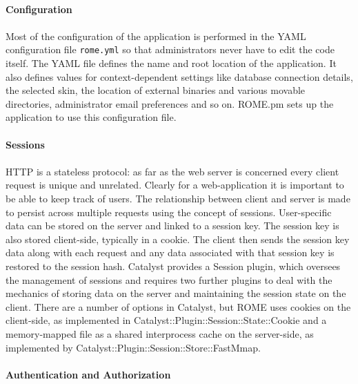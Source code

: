 \paragraph{Configuration}
\paragraph{}
Most of the configuration of the application is performed in the YAML configuration file \texttt{rome.yml} so that administrators never have to edit the code itself. The YAML file defines the name and root location of the application. It also defines values for context-dependent settings like database connection details, the selected skin, the location of external binaries and various movable directories, administrator email preferences and so on. ROME.pm sets up the application to use this configuration file.



\paragraph{Sessions}
\paragraph{}
HTTP is a stateless protocol: as far as the web server is concerned every client request is unique and unrelated. Clearly for a web-application it is important to be able to keep track of users. The relationship between client and server is made to persist across multiple requests using the concept of sessions. User-specific data can be stored on the server and linked to a session key. The session key is also stored client-side, typically in a cookie. The client then sends the session key data along with each request and any data associated with that session key is restored to the session hash. Catalyst provides a Session plugin, which oversees the management of sessions and requires two further plugins to deal with the mechanics of storing data on the server and maintaining the session state on the client. There are a number of options in Catalyst, but ROME uses cookies on the client-side, as implemented in Catalyst::Plugin::Session::State::Cookie and a memory-mapped file as a shared interprocess cache on the server-side, as implemented by Catalyst::Plugin::Session::Store::FastMmap.


\paragraph{Authentication and Authorization}

